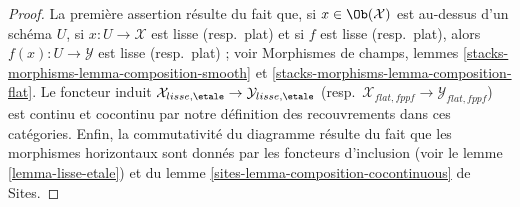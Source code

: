 \begin{proof}
La première assertion résulte du fait que, si $x \in \Ob(\mathcal{X})$
est au-dessus d'un schéma $U$, si $x : U \to \mathcal{X}$ est lisse
(resp.\ plat) et si $f$ est lisse (resp.\ plat), alors
$f(x) : U \to \mathcal{Y}$ est lisse (resp.\ plat) ; voir
Morphismes de champs, lemmes \ref{stacks-morphisms-lemma-composition-smooth} et
\ref{stacks-morphisms-lemma-composition-flat}. Le foncteur induit
$\mathcal{X}_{lisse,\etale} \to \mathcal{Y}_{lisse,\etale}$
(resp.\ $\mathcal{X}_{flat,fppf} \to \mathcal{Y}_{flat,fppf}$) est
continu et cocontinu par notre définition des recouvrements dans ces
catégories. Enfin, la commutativité du diagramme résulte du fait que les
morphismes horizontaux sont donnés par les foncteurs d'inclusion (voir le
lemme \ref{lemma-lisse-etale}) et du
lemme \ref{sites-lemma-composition-cocontinuous} de Sites.


\end{proof}
